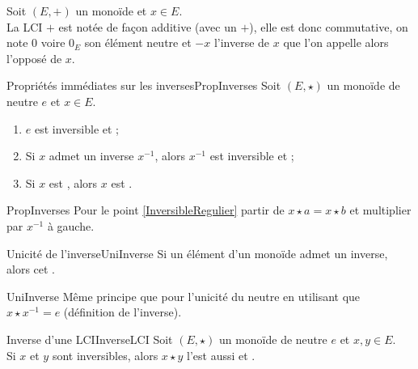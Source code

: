 \documentclass[12pt,a4paper]{report}
\begin{document}
    \begin{remarque}
    Soit $(E, +)$ un monoïde et $x \in E$.\\
    La LCI $+$ est notée de façon additive (\ie avec un $+$), elle est donc commutative, on note 0 voire $0_E$ son élément neutre et $-x$ l'inverse de $x$ que l'on appelle alors l'opposé de $x$.
    \end{remarque}
    
    \begin{propositions}{Propriétés immédiates sur les inverses}{PropInverses}
    Soit $(E, \star)$ un monoïde de neutre $e$ et $x \in E$.
    \begin{enumerate}[label=\bfseries\arabic*)]
        \item $e$ est inversible et  ;
        \item Si $x$ admet un inverse $x^{-1}$, alors $x^{-1}$ est inversible et  ;
        \item\label{InversibleRegulier} Si $x$ est , alors $x$ est .
    \end{enumerate}
    \end{propositions}
    
    \begin{principedemo}{PropInverses}
    Pour le point \ref{InversibleRegulier} partir de $x \star a = x \star b$ et multiplier par $x^{-1}$ à gauche.
    \end{principedemo}
    
    \begin{proposition}{Unicité de l'inverse}{UniInverse}
    Si un élément d'un monoïde admet un inverse, alors cet .
    \end{proposition}
    
    \begin{principedemo}{UniInverse}
    Même principe que pour l'unicité du neutre en utilisant que $x \star x^{-1} = e$ (définition de l'inverse).
    \end{principedemo}
    
    \begin{proposition}{Inverse d'une LCI}{InverseLCI}
    Soit $(E, \star)$ un monoïde de neutre $e$ et $x, y \in E$.\\
    Si $x$ et $y$ sont inversibles, alors $x \star y$ l'est aussi et . 
    \end{proposition}
    
\end{document}
